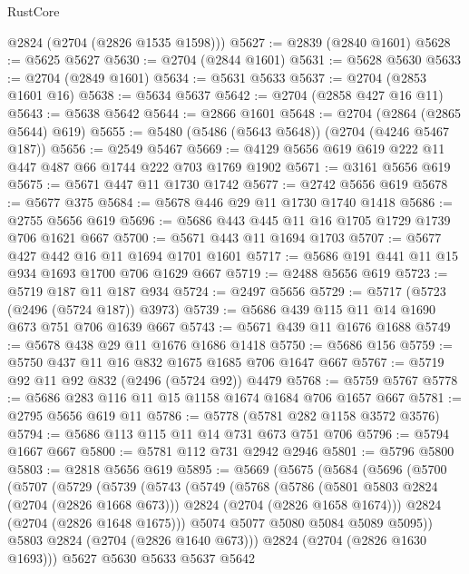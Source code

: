 \begin{lexlean}{RustCore}
\begin{coremodule}
      @2824
      (@2704 (@2826 @1535 @1598)))
@5627 := @2839 (@2840 @1601)
@5628 := @5625 @5627
@5630 := @2704 (@2844 @1601)
@5631 := @5628 @5630
@5633 := @2704 (@2849 @1601)
@5634 := @5631 @5633
@5637 := @2704 (@2853 @1601 @16)
@5638 := @5634 @5637
@5642 := @2704 (@2858 @427 @16 @11)
@5643 := @5638 @5642
@5644 := @2866 @1601
@5648 := @2704 (@2864 (@2865 @5644) @619)
@5655 := @5480 (@5486 (@5643 @5648)) (@2704 (@4246 @5467 @187))
@5656 := @2549 @5467
@5669 := @4129 @5656 @619 @619 @222 @11 @447 @487 @66 @1744 @222 @703 @1769 @1902
@5671 := @3161 @5656 @619
@5675 := @5671 @447 @11 @1730 @1742
@5677 := @2742 @5656 @619
@5678 := @5677 @375
@5684 := @5678 @446 @29 @11 @1730 @1740 @1418
@5686 := @2755 @5656 @619
@5696 := @5686 @443 @445 @11 @16 @1705 @1729 @1739 @706 @1621 @667
@5700 := @5671 @443 @11 @1694 @1703
@5707 := @5677 @427 @442 @16 @11 @1694 @1701 @1601
@5717 := @5686 @191 @441 @11 @15 @934 @1693 @1700 @706 @1629 @667
@5719 := @2488 @5656 @619
@5723 := @5719 @187 @11 @187 @934
@5724 := @2497 @5656
@5729 := @5717 (@5723 (@2496 (@5724 @187)) @3973)
@5739 := @5686 @439 @115 @11 @14 @1690 @673 @751 @706 @1639 @667
@5743 := @5671 @439 @11 @1676 @1688
@5749 := @5678 @438 @29 @11 @1676 @1686 @1418
@5750 := @5686 @156
@5759 := @5750 @437 @11 @16 @832 @1675 @1685 @706 @1647 @667
@5767 := @5719 @92 @11 @92 @832 (@2496 (@5724 @92)) @4479
@5768 := @5759 @5767
@5778 := @5686 @283 @116 @11 @15 @1158 @1674 @1684 @706 @1657 @667
@5781 := @2795 @5656 @619 @11
@5786 := @5778 (@5781 @282 @1158 @3572 @3576)
@5794 := @5686 @113 @115 @11 @14 @731 @673 @751 @706
@5796 := @5794 @1667 @667
@5800 := @5781 @112 @731 @2942 @2946
@5801 := @5796 @5800
@5803 := @2818 @5656 @619
@5895 := @5669
    (@5675
      (@5684
        (@5696
          (@5700
            (@5707
              (@5729
                (@5739
                  (@5743
                    (@5749
                      (@5768
                        (@5786
                          (@5801 @5803 @2824 (@2704 (@2826 @1668 @673)))
                          @2824
                          (@2704 (@2826 @1658 @1674)))
                        @2824
                        (@2704 (@2826 @1648 @1675)))
                      @5074
                      @5077
                      @5080
                      @5084
                      @5089
                      @5095))
                  @5803
                  @2824
                  (@2704 (@2826 @1640 @673)))
                @2824
                (@2704 (@2826 @1630 @1693)))
              @5627
              @5630
              @5633
              @5637
              @5642

\end{coremodule}
\end{lexlean}
